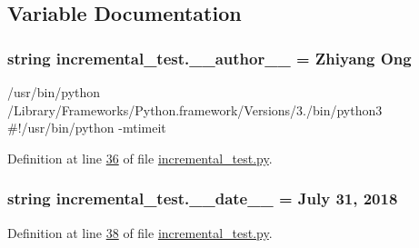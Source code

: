 \subsection{Variable Documentation}
\hypertarget{namespaceincremental__test_a5f6427d0e520c9febabce9161afb249b}{}
\subsubsection[{\+\_\+\+\_\+author\+\_\+\+\_\+}]{\setlength{\rightskip}{0pt plus 5cm}string incremental\+\_\+test.\+\_\+\+\_\+author\+\_\+\+\_\+ = \textquotesingle{}Zhiyang Ong\textquotesingle{}}\label{namespaceincremental__test_a5f6427d0e520c9febabce9161afb249b}


/usr/bin/python /\+Library/\+Frameworks/\+Python.framework/\+Versions/3./bin/python3 \#!/usr/bin/python -\/mtimeit 



Definition at line \hyperlink{incremental__test_8py_source_l00036}{36} of file \hyperlink{incremental__test_8py_source}{incremental\+\_\+test.\+py}.

\hypertarget{namespaceincremental__test_afce713750b4dd215527495dfc84d047e}{}
\subsubsection[{\+\_\+\+\_\+date\+\_\+\+\_\+}]{\setlength{\rightskip}{0pt plus 5cm}string incremental\+\_\+test.\+\_\+\+\_\+date\+\_\+\+\_\+ = \textquotesingle{}July 31, 2018\textquotesingle{}}\label{namespaceincremental__test_afce713750b4dd215527495dfc84d047e}


Definition at line \hyperlink{incremental__test_8py_source_l00038}{38} of file \hyperlink{incremental__test_8py_source}{incremental\+\_\+test.\+py}.

\hypertarget{namespaceincremental__test_a0f94dd1f320b9558e27a5809d2041c4c}{}
